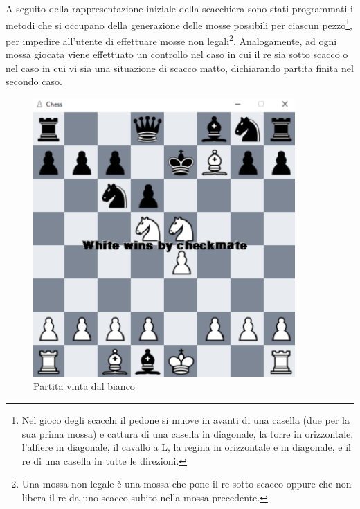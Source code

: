 \newpage

A seguito della rappresentazione iniziale della scacchiera sono stati programmati i metodi che si occupano della generazione delle mosse possibili per ciascun pezzo\footnote{Nel gioco degli scacchi il pedone si muove in avanti di una casella (due per la sua prima mossa) e cattura di una casella in diagonale, la torre in orizzontale, l'alfiere in diagonale, il cavallo a L, la regina in orizzontale e in diagonale, e il re di una casella in tutte le direzioni.}, per impedire all'utente di effettuare mosse non legali\footnote{Una mossa non legale è una mossa che pone il re sotto scacco oppure che non libera il re da uno scacco subito nella mossa precedente.}. Analogamente, ad ogni mossa giocata viene effettuato un controllo nel caso in cui il re sia sotto scacco o nel caso in cui vi sia una situazione di scacco matto, dichiarando partita finita nel secondo caso.
\begin{figure}[!htb]
    \includegraphics[width=10cm]{frontmatter/figure/checkmate.pdf}
    \centering
    \caption{Partita vinta dal bianco}
    \label{fig:checkmate}
\end{figure}


